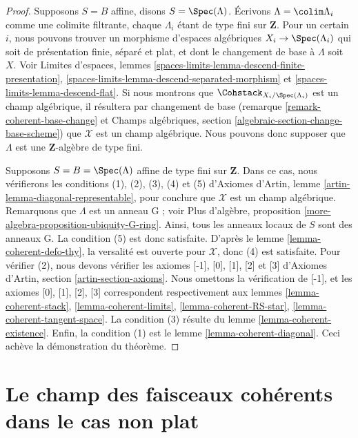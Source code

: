 \begin{proof}
\medskip\noindent
Supposons $S = B$ affine, disons $S = \Spec(\Lambda)$. Écrivons
$\Lambda = \colim \Lambda_i$ comme une colimite filtrante, chaque $\Lambda_i$
étant de type fini sur $\mathbf{Z}$. Pour un certain $i$, nous pouvons trouver
un morphisme d'espaces algébriques $X_i \to \Spec(\Lambda_i)$ qui soit de
présentation finie, séparé et plat, et dont le changement de base à $\Lambda$
soit $X$. Voir Limites d'espaces, lemmes
\ref{spaces-limits-lemma-descend-finite-presentation},
\ref{spaces-limits-lemma-descend-separated-morphism} et
\ref{spaces-limits-lemma-descend-flat}. Si nous montrons que
$\Cohstack_{X_i/\Spec(\Lambda_i)}$ est un champ algébrique, il résultera par
changement de base (remarque \ref{remark-coherent-base-change} et Champs
algébriques, section \ref{algebraic-section-change-base-scheme}) que
$\mathcal{X}$ est un champ algébrique. Nous pouvons donc supposer que
$\Lambda$ est une $\mathbf{Z}$-algèbre de type fini.

\medskip\noindent
Supposons $S = B = \Spec(\Lambda)$ affine de type fini sur $\mathbf{Z}$. Dans
ce cas, nous vérifierons les conditions (1), (2), (3), (4) et (5) d'Axiomes
d'Artin, lemme \ref{artin-lemma-diagonal-representable}, pour conclure que
$\mathcal{X}$ est un champ algébrique. Remarquons que $\Lambda$ est un
anneau G ; voir Plus d'algèbre, proposition
\ref{more-algebra-proposition-ubiquity-G-ring}. Ainsi, tous les anneaux locaux
de $S$ sont des anneaux G. La condition (5) est donc satisfaite. D'après le
lemme \ref{lemma-coherent-defo-thy}, la versalité est ouverte pour
$\mathcal{X}$, donc (4) est satisfaite. Pour vérifier (2), nous devons vérifier
les axiomes [-1], [0], [1], [2] et [3] d'Axiomes d'Artin, section
\ref{artin-section-axioms}. Nous omettons la vérification de [-1], et les
axiomes [0], [1], [2], [3] correspondent respectivement aux lemmes
\ref{lemma-coherent-stack}, \ref{lemma-coherent-limits},
\ref{lemma-coherent-RS-star}, \ref{lemma-coherent-tangent-space}. La condition
(3) résulte du lemme \ref{lemma-coherent-existence}. Enfin, la condition (1)
est le lemme \ref{lemma-coherent-diagonal}. Ceci achève la démonstration du
théorème.
\end{proof}









\section{Le champ des faisceaux cohérents dans le cas non plat}
\label{section-not-flat}

